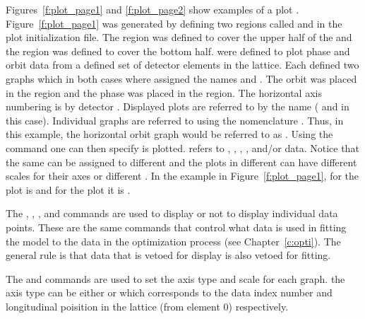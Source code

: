 Figures~\ref{f:plot_page1} and \ref{f:plot_page2} show examples of a
plot . Figure~\ref{f:plot_page1} was generated by defining
two regions called  and  in the plot initialization
file. The  region was defined to cover the upper half of the
 and the  region was defined to cover the bottom
half.  were defined to plot phase and orbit data
from a defined set of detector elements in the lattice. Each
 defined two graphs which in both cases where
assigned the names  and . The orbit  was
placed in the  region and the phase  was
placed in the  region. The horizontal axis numbering is by
detector .  Displayed plots are referred to by the
 name ( and  in this case). Individual
graphs are referred to using the nomenclature
. Thus, in this example, the horizontal orbit graph
would be referred to as .  Using the  command one
can then specify  is plotted.  refers to
, , , , and/or
 data.  Notice that the same  can be
assigned to different  and the plots in different
 can have different scales for their axes or different
. In the example in Figure~\ref{f:plot_page1},  for the
 plot is  and for the  plot it is
.

The , , , and  commands are used
to display or not to display individual data points. These are the
same commands that control what data is used in fitting the model to
the data in the optimization process (see Chapter~\ref{c:opti}). The
general rule is that data that is vetoed for display is also vetoed
for fitting.

The  and  commands are used to set the axis type and
scale for each graph. the axis type can be either  or  which
corresponds to the data index number and longitudinal poisition in the lattice
(from element 0) respectively.

